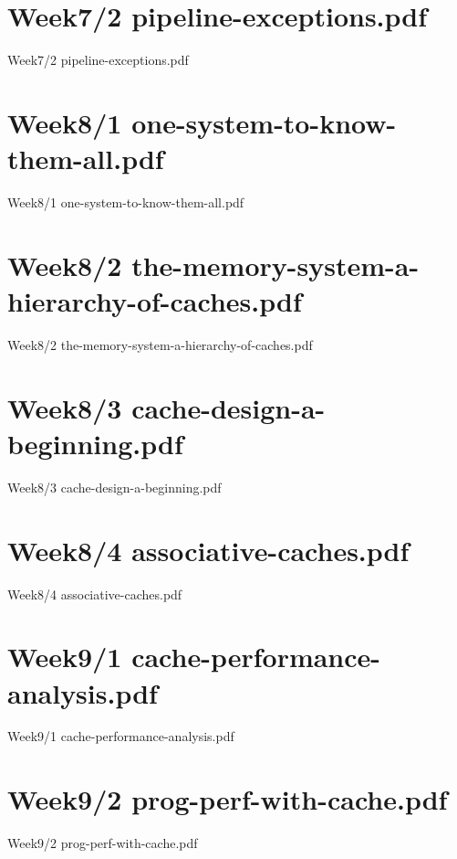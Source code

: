 \documentclass[aspectratio = 169]{beamer}
\begin{document}
\section{Week7/2 pipeline-exceptions.pdf}
\begin{frame}{Week7/2 pipeline-exceptions.pdf}
\end{frame}

\section{Week8/1 one-system-to-know-them-all.pdf}
\begin{frame}{Week8/1 one-system-to-know-them-all.pdf}
\end{frame}

\section{Week8/2 the-memory-system-a-hierarchy-of-caches.pdf}
\begin{frame}{Week8/2 the-memory-system-a-hierarchy-of-caches.pdf}
\end{frame}

\section{Week8/3 cache-design-a-beginning.pdf}
\begin{frame}{Week8/3 cache-design-a-beginning.pdf}
\end{frame}

\section{Week8/4 associative-caches.pdf}
\begin{frame}{Week8/4 associative-caches.pdf}
\end{frame}

\section{Week9/1 cache-performance-analysis.pdf}
\begin{frame}{Week9/1 cache-performance-analysis.pdf}
\end{frame}

\section{Week9/2 prog-perf-with-cache.pdf}
\begin{frame}{Week9/2 prog-perf-with-cache.pdf}
\end{frame}

\end{document}
